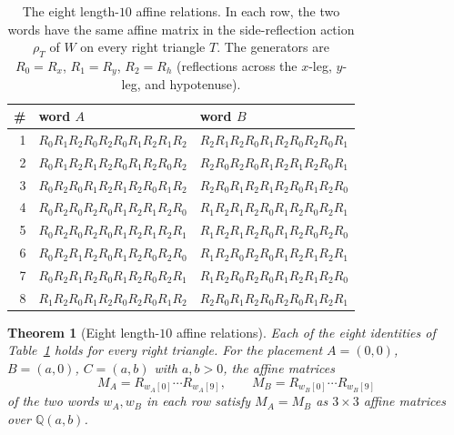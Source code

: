 \documentclass[11pt]{article}
\theoremstyle{plain}
\newtheorem{theorem}{Theorem}
\theoremstyle{definition}
\theoremstyle{remark}
\begin{document}
\begin{table}[ht!]
\centering
\small
\renewcommand{\arraystretch}{1.2}
\begin{tabular}{r l l}
\toprule
\# & word $A$ & word $B$ \\
\midrule
1 & $R_0 R_1 R_2 R_0 R_2 R_0 R_1 R_2 R_1 R_2$ &
    $R_2 R_1 R_2 R_0 R_1 R_2 R_0 R_2 R_0 R_1$ \\
2 & $R_0 R_1 R_2 R_1 R_2 R_0 R_1 R_2 R_0 R_2$ &
    $R_2 R_0 R_2 R_0 R_1 R_2 R_1 R_2 R_0 R_1$ \\
3 & $R_0 R_2 R_0 R_1 R_2 R_1 R_2 R_0 R_1 R_2$ &
    $R_2 R_0 R_1 R_2 R_1 R_2 R_0 R_1 R_2 R_0$ \\
4 & $R_0 R_2 R_0 R_2 R_0 R_1 R_2 R_1 R_2 R_0$ &
    $R_1 R_2 R_1 R_2 R_0 R_1 R_2 R_0 R_2 R_1$ \\
5 & $R_0 R_2 R_0 R_2 R_0 R_1 R_2 R_1 R_2 R_1$ &
    $R_1 R_2 R_1 R_2 R_0 R_1 R_2 R_0 R_2 R_0$ \\
6 & $R_0 R_2 R_1 R_2 R_0 R_1 R_2 R_0 R_2 R_0$ &
    $R_1 R_2 R_0 R_2 R_0 R_1 R_2 R_1 R_2 R_1$ \\
7 & $R_0 R_2 R_1 R_2 R_0 R_1 R_2 R_0 R_2 R_1$ &
    $R_1 R_2 R_0 R_2 R_0 R_1 R_2 R_1 R_2 R_0$ \\
8 & $R_1 R_2 R_0 R_1 R_2 R_0 R_2 R_0 R_1 R_2$ &
    $R_2 R_0 R_1 R_2 R_0 R_2 R_0 R_1 R_2 R_1$ \\
\bottomrule
\end{tabular}
\caption{The eight length-$10$ affine relations. In each row, the two words
have the same affine matrix in the side-reflection action $\rho_T$ of $W$ on
every right triangle $T$. The generators are $R_0 = R_x$, $R_1 = R_y$,
$R_2 = R_h$ (reflections across the $x$-leg, $y$-leg, and hypotenuse).}
\label{tab:bonfioli}
\end{table}

\begin{theorem}[Eight length-$10$ affine relations]
\label{thm:symbolic}
Each of the eight identities of Table~\ref{tab:bonfioli} holds for every right
triangle. For the placement $A=(0,0)$, $B=(a,0)$, $C=(a,b)$ with $a,b>0$, the
affine matrices
\[
M_A = R_{w_A[0]}\cdots R_{w_A[9]}, \qquad
M_B = R_{w_B[0]}\cdots R_{w_B[9]}
\]
of the two words $w_A, w_B$ in each row satisfy $M_A = M_B$ as $3\times 3$
affine matrices over $\mathbb{Q}(a,b)$.
\end{theorem}
\end{document}
